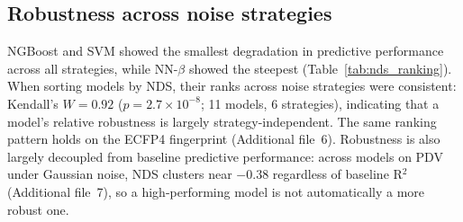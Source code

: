 \documentclass[pdflatex,sn-basic]{sn-jnl}%
\theoremstyle{thmstyleone}%
\theoremstyle{thmstyletwo}%
\theoremstyle{thmstylethree}%
\begin{document}
\subsection{Robustness across noise strategies}

NGBoost and SVM showed the smallest degradation in predictive performance across all strategies, while NN-$\beta$ showed the steepest (Table~\ref{tab:nds_ranking}). When sorting models by NDS, their ranks across noise strategies were consistent: Kendall's $W = 0.92$ ($p = 2.7 \times 10^{-8}$; 11 models, 6 strategies), indicating that a model's relative robustness is largely strategy-independent. The same ranking pattern holds on the ECFP4 fingerprint (Additional file~6). Robustness is also largely decoupled from baseline predictive performance: across models on PDV under Gaussian noise, NDS clusters near $-0.38$ regardless of baseline R$^2$ (Additional file~7), so a high-performing model is not automatically a more robust one.
\end{document}
